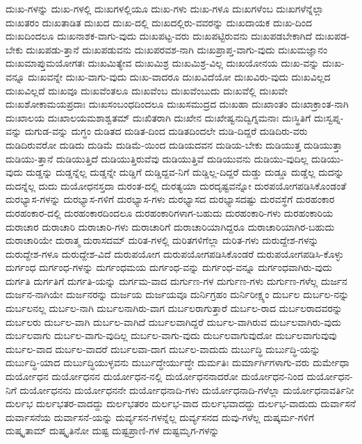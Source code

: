 {ದುಃಖ-ಗಳನ್ನು
ದುಃಖ-ಗಳಲ್ಲಿ
ದುಃಖಗಳಲ್ಲಿಯೂ
ದುಃಖ-ಗಳು
ದುಃಖ-ಗಳೂ
ದುಃಖಗಳೆಂಬ
ದುಃಖಗಳೆನ್ನೆಲ್ಲಾ
ದುಃಖತರಂ
ದುಃಖತಾಡಿತ
ದುಃಖದ
ದುಃಖ-ದಲ್ಲಿ
ದುಃಖದಲ್ಲಿರು-ವವರನ್ನು
ದುಃಖದಾಯಕ
ದುಃಖ-ದಿಂದ
ದುಃಖದಿಂದಲೂ
ದುಃಖನಾಶಕ-ವಾಗು-ವುದು
ದುಃಖಪಟ್ಟ-ವರು
ದುಃಖಪಟ್ಟಿರುವನು
ದುಃಖಪಡಬೇಕಾಗಿದೆ
ದುಃಖಪಡ-ಬೇಕು
ದುಃಖಪಡು-ತ್ತಾನೆ
ದುಃಖಪಡುವನು
ದುಃಖಪರವಶ-ನಾಗಿ
ದುಃಖಪ್ರಾಪ್ತ-ವಾಗು-ವುದು
ದುಃಖಮಜ್ಞಾನಂ
ದುಃಖಮಾಪ್ತುಮಯೋಗತಃ
ದುಃಖಮಿತ್ಯೇವ
ದುಃಖಮಿಶ್ರ
ದುಃಖಮಿಶ್ರ-ವಿಲ್ಲ
ದುಃಖಯೋನಯ
ದುಃಖ-ವನ್ನು
ದುಃಖ-ವನ್ನೂ
ದುಃಖವನ್ನೇ
ದುಃಖ-ವಾಗು-ವುದು
ದುಃಖ-ವಾದರೂ
ದುಃಖವಿದೆಯೋ
ದುಃಖವಿರು-ವುದು
ದುಃಖವಿಲ್ಲದ
ದುಃಖವಿಲ್ಲದೆ
ದುಃಖವೂ
ದುಃಖವೆಂತಲೂ
ದುಃಖವೆಂಬ
ದುಃಖವೆಂಬುದು
ದುಃಖವೆಲ್ಲಿ
ದುಃಖವೇ
ದುಃಖಶೋಕಾಮಯಪ್ರದಾಃ
ದುಃಖಸಂಬಂಧದಿಂದಲೂ
ದುಃಖಸಮುದ್ರದ
ದುಃಖಹಾ
ದುಃಖಾಂತಂ
ದುಃಖಾಕ್ರಾಂತ-ನಾಗಿ
ದುಃಖಾಲಯ
ದುಃಖಾಲಯಮಶಾಶ್ವತಮ್
ದುಃಖಿತರಾಗಿ
ದುಃಖೇನ
ದುಃಖೇಷ್ವನುದ್ವಿಗ್ನಮನಾಃ
ದುಃಸ್ಥಿತಿಗೆ
ದುಃಸ್ವಪ್ನ-ವನ್ನು
ದುಗುಡ-ವನ್ನು
ದುಗ್ಧಂ
ದುಡಿತದ
ದುಡಿತ-ದಿಂದ
ದುಡಿತದಿಂದಲೇ
ದುಡಿ-ದಿದ್ದರೆ
ದುಡಿದಿರು-ವರು
ದುಡಿದಿರುವರೋ
ದುಡಿದು
ದುಡಿಮೆ
ದುಡಿಮೆ-ಯಿಂದ
ದುಡಿಯದವನ
ದುಡಿಯ-ಬೇಕು
ದುಡಿಯುತ್ತ
ದುಡಿಯುತ್ತಾ
ದುಡಿಯು-ತ್ತಾನೆ
ದುಡಿಯುತ್ತಿದೆ
ದುಡಿಯುತ್ತಿರುವೆವು
ದುಡಿಯುತ್ತಿವೆ
ದುಡಿಯುವನು
ದುಡಿಯು-ವುದಿಲ್ಲ
ದುಡಿಯು-ವುದು
ದುಡ್ಡನ್ನು
ದುಡ್ಡನ್ನೆಲ್ಲ
ದುಡ್ಡನ್ನೇ
ದುಡ್ಡಿಗೆ
ದುಡ್ಡಿದ್ದವ-ನಿಗೆ
ದುಡ್ಡಿಲ್ಲ-ದಿದ್ದರೆ
ದುಡ್ಡು
ದುಡ್ಡೂ
ದುಡ್ಡೆಲ್ಲ
ದುದನ್ನು
ದುದನ್ನೆಲ್ಲ
ದುದು
ದುಯೋಧನಸ್ತದಾ
ದುರಂತ-ದಲ್ಲಿ
ದುರತ್ಯಯಾ
ದುರದೃಷ್ಟವನ್ನೋ
ದುರಪಯೋಗಪಡಿಸಿಕೊಂಡಂತೆ
ದುರಭ್ಯಾಸ-ಗಳನ್ನು
ದುರಭ್ಯಾಸ-ಗಳಿಗೆ
ದುರಭ್ಯಾಸ-ಗಳು
ದುರಭ್ಯಾಸದ
ದುರಭ್ಯಾಸದಷ್ಟು
ದುರವಸ್ಥೆಗೆ
ದುರಹಂಕಾರ
ದುರಹಂಕಾರ-ದಲ್ಲಿ
ದುರಹಂಕಾರದಿಂದಲೂ
ದುರಹಂಕಾರಿಗಳಾಗ-ಬಹುದು
ದುರಹಂಕಾರಿ-ಗಳು
ದುರಹಂಕಾರಿಯ
ದುರಾಚಾರ
ದುರಾಚಾರಿ
ದುರಾಚಾರಿ-ಗಳು
ದುರಾಚಾರಿಗೆ
ದುರಾಚಾರಿಯಾಗಿದ್ದರೂ
ದುರಾಚಾರಿಯಾಗಿರ-ಬಹುದು
ದುರಾಚಾರಿಯೇ
ದುರಾತ್ಮ
ದುರಾಸದಮ್
ದುರಿತ-ಗಳಲ್ಲಿ
ದುರಿತಗಳಿಗೆಲ್ಲಾ
ದುರಿತ-ಗಳು
ದುರುದ್ದೇಶ-ಗಳನ್ನು
ದುರುದ್ದೇಶ-ಗಳೂ
ದುರುದ್ದೇಶ-ವಿದೆ
ದುರುಪಯೋಗ
ದುರುಪಯೋಗಪಡಿಸಿಕೊಂಡರೆ
ದುರುಪಯೋಗಪಡಿಸಿ-ಕೊಳ್ಳು
ದುರ್ಗಂಧ
ದುರ್ಗಂಧ-ಗಳನ್ನು
ದುರ್ಗಂಧಮಯ
ದುರ್ಗಂಧ-ವನ್ನು
ದುರ್ಗಂಧ-ವನ್ನೂ
ದುರ್ಗಂಧವಾಗಿರು-ವುದು
ದುರ್ಗತಿ
ದುರ್ಗತಿಗೆ
ದುರ್ಗತಿ-ಯನ್ನು
ದುರ್ಗಮ-ವಾದ
ದುರ್ಗುಣ-ಗಳ
ದುರ್ಗುಣ-ಗಳು
ದುರ್ಗುಣ-ಗಳೆಲ್ಲ
ದುರ್ಜನ
ದುರ್ಜನ-ನಾಗಿಯೇ
ದುರ್ಜನರನ್ನು
ದುರ್ಜಯ
ದುರ್ಜಯವೂ
ದುರ್ನಿಗ್ರಹಂ
ದುರ್ನಿರೀಕ್ಷ್ಯಂ
ದುರ್ಬಲ
ದುರ್ಬಲ-ನನ್ನು
ದುರ್ಬಲನಲ್ಲ
ದುರ್ಬಲ-ನಾಗಿ
ದುರ್ಬಲನಾಗಿರು-ವಾಗ
ದುರ್ಬಲರಾಗುತ್ತಾರೆ
ದುರ್ಬಲ-ರಾದ
ದುರ್ಬಲರಾದವರನ್ನು
ದುರ್ಬಲರು
ದುರ್ಬಲ-ವಾಗಿ
ದುರ್ಬಲ-ವಾಗಿದೆ
ದುರ್ಬಲವಾಗಿದ್ದರೆ
ದುರ್ಬಲ-ವಾಗಿರುವ
ದುರ್ಬಲವಾಗಿರು-ವುದು
ದುರ್ಬಲವಾಗು
ದುರ್ಬಲ-ವಾಗು-ವುದಿಲ್ಲ
ದುರ್ಬಲ-ವಾಗು-ವುದು
ದುರ್ಬಲವಾಗುವುದೋ
ದುರ್ಬಲವಾಗುವುವು
ದುರ್ಬಲ-ವಾದ
ದುರ್ಬಲ-ವಾದರೆ
ದುರ್ಬಲವಾ-ದಾಗ
ದುರ್ಬಲ-ವಾದುದು
ದುರ್ಬುದ್ಧಿ
ದುರ್ಬುದ್ಧಿ-ಯನ್ನು
ದುರ್ಬುದ್ಧಿ-ಯಾದ
ದುರ್ಬುದ್ಧಿಯುಳ್ಳವನು
ದುರ್ಬುದ್ಧೇರ್ಯುದ್ಧೇ
ದುರ್ಮತಿಃ
ದುರ್ಮಾರ್ಗಿಗಳಾಗು-ವರು
ದುರ್ಮೇಧಾ
ದುರ್ಯೋಧನ
ದುರ್ಯೋಧನನ
ದುರ್ಯೋಧನ-ನಲ್ಲಿ
ದುರ್ಯೋಧನನಾದರೋ
ದುರ್ಯೋಧನ-ನಿಂದ
ದುರ್ಯೋಧನ-ನಿಗೆ
ದುರ್ಯೋಧನನು
ದುರ್ಯೋಧನನೇ
ದುರ್ಯೋಧನಾದಿ-ಗಳು
ದುರ್ಯೋಧನಾದಿ-ಗಳೆಲ್ಲಾ
ದುರ್ಯೋಧನಾವರ್ತಿನೀ
ದುರ್ಲಭ
ದುರ್ಲಭತರ-ವಾದದ್ದು
ದುರ್ಲಭತರಂ
ದುರ್ಲಭ-ವಾದ
ದುರ್ಲಭವಾದದ್ದು
ದುರ್ಲಭ-ವಾದುದು
ದುರ್ವಾಸನೆ
ದುರ್ವಾಸನೆಯ
ದುರ್ವಾಸನೆ-ಯನ್ನು
ದುರ್ವ್ಯಸನ-ಗಳನ್ನೆಲ್ಲ
ದುರ್ವ್ಯಸನದ
ದುವು-ಗಳೆಲ್ಲ
ದುಷ್ಕರ್ಮ-ಗಳಿಗೆ
ದುಷ್ಕೃತಾಮ್
ದುಷ್ಕೃತಿನೋ
ದುಷ್ಟ
ದುಷ್ಟಪ್ರಾಣಿ-ಗಳ
ದುಷ್ಟಮೃಗ-ಗಳನ್ನು
}
